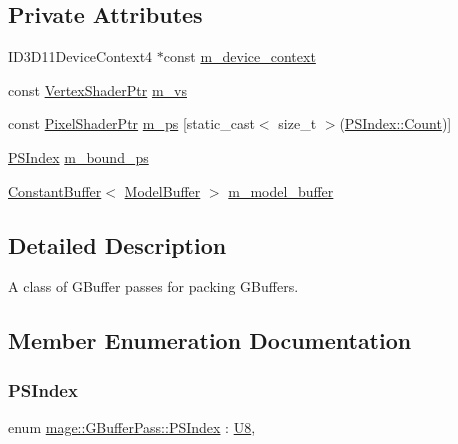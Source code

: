 \subsection*{Private Attributes}
\begin{DoxyCompactItemize}
\item 
I\+D3\+D11\+Device\+Context4 $\ast$const \hyperlink{classmage_1_1_g_buffer_pass_a56bcb08adf8a9b04a15efe24ef703c32}{m\+\_\+device\+\_\+context}
\item 
const \hyperlink{namespacemage_a1f19b094f771e30bc0a6c1cebcc0dd58}{Vertex\+Shader\+Ptr} \hyperlink{classmage_1_1_g_buffer_pass_af0a641e0246f6d90b5ff3c010fad7bd0}{m\+\_\+vs}
\item 
const \hyperlink{namespacemage_acbec875bb5e5e085e32ed244a24d2b6f}{Pixel\+Shader\+Ptr} \hyperlink{classmage_1_1_g_buffer_pass_a0a94aa51d00b6b057bb9b10f1a2f8eff}{m\+\_\+ps} \mbox{[}static\+\_\+cast$<$ size\+\_\+t $>$(\hyperlink{classmage_1_1_g_buffer_pass_a23039b6695c10c88676c38fe63123571ae93f994f01c537c4e2f7d8528c3eb5e9}{P\+S\+Index\+::\+Count})\mbox{]}
\item 
\hyperlink{classmage_1_1_g_buffer_pass_a23039b6695c10c88676c38fe63123571}{P\+S\+Index} \hyperlink{classmage_1_1_g_buffer_pass_aef8452f64c9815d002e552957ed9e342}{m\+\_\+bound\+\_\+ps}
\item 
\hyperlink{classmage_1_1_constant_buffer}{Constant\+Buffer}$<$ \hyperlink{structmage_1_1_model_buffer}{Model\+Buffer} $>$ \hyperlink{classmage_1_1_g_buffer_pass_a0538769957df6740993dbb479b7e05a2}{m\+\_\+model\+\_\+buffer}
\end{DoxyCompactItemize}


\subsection{Detailed Description}
A class of G\+Buffer passes for packing G\+Buffers. 

\subsection{Member Enumeration Documentation}
\hypertarget{classmage_1_1_g_buffer_pass_a23039b6695c10c88676c38fe63123571}{}\label{classmage_1_1_g_buffer_pass_a23039b6695c10c88676c38fe63123571} 
\subsubsection{\texorpdfstring{P\+S\+Index}{PSIndex}}
{\footnotesize\ttfamily enum \hyperlink{classmage_1_1_g_buffer_pass_a23039b6695c10c88676c38fe63123571}{mage\+::\+G\+Buffer\+Pass\+::\+P\+S\+Index} \+: \hyperlink{namespacemage_afc638980bc6154f15af5e2d93a0e0ea9}{U8}\hspace{0.3cm}{\ttfamily [strong]}, {\ttfamily [private]}}

